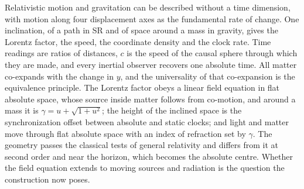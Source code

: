 \documentclass{iopjournal}
\begin{document}
Relativistic motion and gravitation can be described without a time dimension, with motion along four displacement axes as the fundamental rate of change. One inclination, of a path in SR and of space around a mass in gravity, gives the Lorentz factor, the speed, the coordinate density and the clock rate. Time readings are ratios of distances, $c$ is the speed of the causal sphere through which they are made, and every inertial observer recovers one absolute time. All matter co-expands with the change in $y$, and the universality of that co-expansion is the equivalence principle. The Lorentz factor obeys a linear field equation in flat absolute space, whose source inside matter follows from co-motion, and around a mass it is $\gamma=u+\sqrt{1+u^2}$; the height of the inclined space is the synchronization offset between absolute and static clocks; and light and matter move through flat absolute space with an index of refraction set by $\gamma$. The geometry passes the classical tests of general relativity and differs from it at second order and near the horizon, which becomes the absolute centre. Whether the field equation extends to moving sources and radiation is the question the construction now poses.
\end{document}
